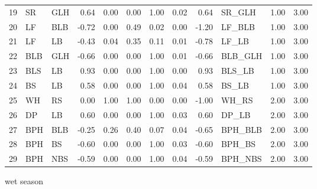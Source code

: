\begin{table}[ht]
\begin{tabular}{rllrrrrrrlrr}
  19 & SR & GLH & 0.64 & 0.00 & 0.00 & 1.00 & 0.02 & 0.64 & SR\_GLH & 1.00 & 3.00 \\ 
  20 & LF & BLB & -0.72 & 0.00 & 0.49 & 0.02 & 0.00 & -1.20 & LF\_BLB & 1.00 & 3.00 \\ 
  21 & LF & LB & -0.43 & 0.04 & 0.35 & 0.11 & 0.01 & -0.78 & LF\_LB & 1.00 & 3.00 \\ 
  22 & BLB & GLH & -0.66 & 0.00 & 0.00 & 1.00 & 0.01 & -0.66 & BLB\_GLH & 1.00 & 3.00 \\ 
  23 & BLS & LB & 0.93 & 0.00 & 0.00 & 1.00 & 0.00 & 0.93 & BLS\_LB & 1.00 & 3.00 \\ 
  24 & BS & LB & 0.58 & 0.00 & 0.00 & 1.00 & 0.04 & 0.58 & BS\_LB & 1.00 & 3.00 \\ 
  25 & WH & RS & 0.00 & 1.00 & 1.00 & 0.00 & 0.00 & -1.00 & WH\_RS & 2.00 & 3.00 \\ 
  26 & DP & LB & 0.60 & 0.00 & 0.00 & 1.00 & 0.03 & 0.60 & DP\_LB & 2.00 & 3.00 \\ 
  27 & BPH & BLB & -0.25 & 0.26 & 0.40 & 0.07 & 0.04 & -0.65 & BPH\_BLB & 2.00 & 3.00 \\ 
  28 & BPH & BS & -0.60 & 0.00 & 0.00 & 1.00 & 0.03 & -0.60 & BPH\_BS & 2.00 & 3.00 \\ 
  29 & BPH & NBS & -0.59 & 0.00 & 0.00 & 1.00 & 0.04 & -0.59 & BPH\_NBS & 2.00 & 3.00 \\ 
   \hline
\end{tabular}
\end{table}

wet season

